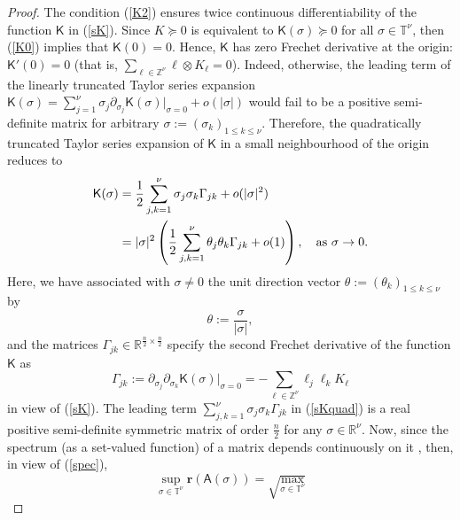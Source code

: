\documentclass[letterpaper, 10pt, conference]{ieeeconf}  %
\def\<{\leqslant}           %
\def\d{\partial}
\def\mZ{\mathbb{Z}}    %
\def\mR{\mathbb{R}}    %
\def\br{\mathbf{r}}
\def\x{\times}
\def\ox{\otimes}
\def\sK{\mathsf{K}}
\def\sA{\mathsf{A}}
\def\mT{\mathbb{T}}
\def\mZ{\mathbb{Z}}
\begin{document}
\begin{proof}
The condition (\ref{K2}) ensures twice continuous differentiability of the function $\sK$ in (\ref{sK}).
Since $K \succcurlyeq 0$ is equivalent to $\sK(\sigma)\succcurlyeq 0$ for all $\sigma \in \mT^\nu$, then (\ref{K0}) implies that $\sK(0)=0$. Hence, $\sK$ has zero Frechet derivative at the origin: $\sK'(0) = 0$ (that is, $\sum_{\ell \in \mZ^\nu}\ell \ox K_{\ell} = 0$). Indeed, otherwise, the leading term of the linearly truncated Taylor series expansion $\sK(\sigma) = \sum_{j=1}^\nu \sigma_j \d_{\sigma_j}\sK(\sigma)\big|_{\sigma = 0} +o(|\sigma|)$ would fail  to be a positive semi-definite matrix for arbitrary $\sigma:= (\sigma_k)_{1\< k\<\nu}$. Therefore, the quadratically truncated Taylor series expansion of $\sK$ in a small neighbourhood of the origin reduces to
\begin{align}
\nonumber
    \sK(\sigma)
    & =
    \frac{1}{2}
    \sum_{j,k=1}^\nu
    \sigma_j \sigma_k
    \Gamma_{jk}
    +
    o(|\sigma|^2)\\
\label{sKquad}
    & =
    |\sigma|^2
    \left(
    \frac{1}{2}
    \sum_{j,k=1}^\nu
    \theta_j \theta_k
    \Gamma_{jk}
    +
    o(1)
    \right),
    \quad
    {\rm as}\ \sigma \to 0.
\end{align}
Here, we have associated with $\sigma\ne 0$ the unit direction vector     $\theta
    :=
    (\theta_k)_{1\< k\< \nu}$ by
\begin{equation}
\label{theta}
    \theta
    :=
    \frac{\sigma}{|\sigma|},
\end{equation}
and the matrices $\Gamma_{jk} \in \mR^{\frac{n}{2}\x \frac{n}{2}}$ specify the second Frechet derivative of the function $\sK$  as
\begin{equation}
\label{Gammajk}
    \Gamma_{jk}
    :=
    \d_{\sigma_j}\d_{\sigma_k}
    \sK(\sigma)
    \big|_{\sigma = 0}
    =
    -
    \sum_{\ell \in \mZ^\nu}
    \ell_j\ell_k
    K_{\ell}
\end{equation}
in view of (\ref{sK}). The leading term     $\sum_{j,k=1}^\nu
    \sigma_j \sigma_k
    \Gamma_{jk}$ in (\ref{sKquad}) is a real positive semi-definite symmetric matrix of order $\frac{n}{2}$ for any $\sigma \in \mR^\nu$. Now, since the spectrum (as a set-valued function) of a matrix depends continuously on it \cite{H_2008,HJ_2007}, then, in view of (\ref{spec}),
\begin{equation}
\label{ommax}
  \sup_{\sigma \in \mT^\nu}
  \br(\sA(\sigma))
  =
  \sqrt{\max_{\sigma \in \mT^\nu}
}
\end{equation}
\end{proof}
\end{document}
